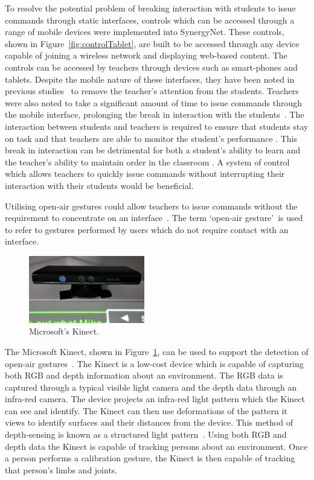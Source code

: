 \documentclass[manuscript, review, screen]{acmart}
\begin{document}
To resolve the potential problem of breaking interaction with students to issue commands through static interfaces, controls which can be accessed through a range of mobile devices were implemented into SynergyNet.
These controls, shown in Figure~\ref{fig:controlTablet}, are built to be accessed through any device capable of joining a wireless network and displaying web-based content.
The controls can be accessed by teachers through devices such as smart-phones and tablets.
Despite the mobile nature of these interfaces, they have been noted in previous studies~\cite{Hatch2011} to remove the teacher's attention from the students.
Teachers were also noted to take a significant amount of time to issue commands through the mobile interface, prolonging the break in interaction with the students~\cite{mcnaughton-et-al:hcis2017}.
The interaction between students and teachers is required to ensure that students stay on task and that teachers are able to monitor the student's performance \cite{Hall1968}.
This break in interaction can be detrimental for both a student's ability to learn and the teacher's ability to maintain order in the classroom \cite{Shirley2010}.
A system of control which allows teachers to quickly issue commands without interrupting their interaction with their students would be beneficial.

Utilising open-air gestures could allow teachers to issue commands without the requirement to concentrate on an interface~\cite{Varona2009,Wachs2011}.
The term \lq open-air gesture\rq\ is used to refer to gestures performed by users which do not require contact with an interface.

\begin{figure}[h]
   \centering
   \includegraphics[width=0.45\textwidth]{figures/control_kinect.png}
   \caption{Microsoft's Kinect.}
   \label{fig:controlKinect}
\end{figure}

The Microsoft Kinect, shown in Figure~\ref{fig:controlKinect}, can be used to support the detection of open-air gestures~\cite{Goth2011}.
The Kinect is a low-cost device which is capable of capturing both RGB and depth information about an environment.
The RGB data is captured through a typical visible light camera and the depth data through an infra-red camera. 
The device projects an infra-red light pattern which the Kinect can see and identify.
The Kinect can then use deformations of the pattern it views to identify surfaces and their distances from the device.
This method of depth-sensing is known as a structured light pattern~\cite{Salvi2010}.
Using both RGB and depth data the Kinect is capable of tracking persons about an environment.
Once a person performs a calibration gesture, the Kinect is then capable of tracking that person's limbs and joints.
\end{document}

